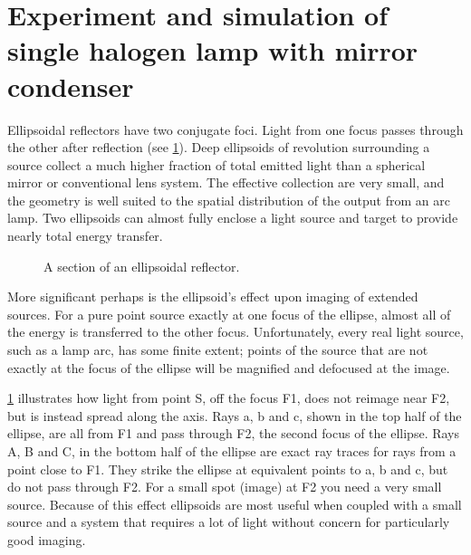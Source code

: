 \section{Experiment and simulation of single halogen lamp with mirror condenser}

Ellipsoidal reflectors have two conjugate foci. Light from one focus passes through the other after reflection (see \ref{Fig:EllipsoidalReflectors}).
Deep ellipsoids of revolution surrounding a source collect a much higher fraction of total emitted light than a spherical mirror or conventional lens system.
The effective collection are very small, and the geometry is well suited to the spatial distribution of the output from an arc lamp.
Two ellipsoids can almost fully enclose a light source and target to provide nearly total energy transfer.
    \begin{figure}[!htp]
        \centering{}
        \caption{A section of an ellipsoidal reflector. }
        \label{Fig:EllipsoidalReflectors}
    \end{figure}
More significant perhaps is the ellipsoid's effect upon imaging of extended sources.
For a pure point source exactly at one focus of the ellipse, almost all of the energy is transferred to the other focus.
Unfortunately, every real light source, such as a lamp arc, has some finite extent; points of the source that are not exactly at the focus of the ellipse will be magnified and defocused at the image.

\ref{Fig:EllipsoidalReflectors} illustrates how light from point S, off the focus F1, does not reimage near F2, but is instead spread along the axis.
Rays a, b and c, shown in the top half of the ellipse, are all from F1 and pass through F2, the second focus of the ellipse. Rays A, B and C, in the bottom half of the ellipse are exact ray traces for rays from a point close to F1. They strike the ellipse at equivalent points to a, b and c, but do not pass through F2. For a small spot (image) at F2 you need a very small source.
Because of this effect ellipsoids are most useful when coupled with a small source and a system that requires a lot of light without concern for particularly good imaging.


